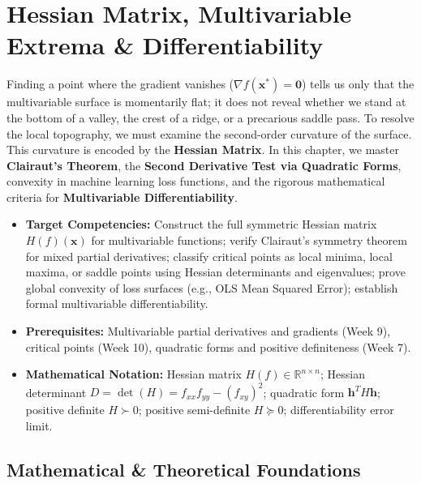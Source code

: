 \chapter{Hessian Matrix, Multivariable Extrema \& Differentiability}

Finding a point where the gradient vanishes ($\nabla f(\mathbf{x}^*) = \mathbf{0}$) tells us only that the multivariable surface is momentarily flat; it does not reveal whether we stand at the bottom of a valley, the crest of a ridge, or a precarious saddle pass. To resolve the local topography, we must examine the second-order curvature of the surface. This curvature is encoded by the \textbf{Hessian Matrix}. In this chapter, we master \textbf{Clairaut's Theorem}, the \textbf{Second Derivative Test via Quadratic Forms}, convexity in machine learning loss functions, and the rigorous mathematical criteria for \textbf{Multivariable Differentiability}.

\vspace{0.5cm}
\begin{tcolorbox}[colback=primarylight, colframe=primarydark, title={\textbf{Executive Roadmap \& Learning Objectives}}]
\begin{itemize}
    \item \textbf{Target Competencies:} Construct the full symmetric Hessian matrix $H(f)(\mathbf{x})$ for multivariable functions; verify Clairaut's symmetry theorem for mixed partial derivatives; classify critical points as local minima, local maxima, or saddle points using Hessian determinants and eigenvalues; prove global convexity of loss surfaces (e.g., OLS Mean Squared Error); establish formal multivariable differentiability.
    \item \textbf{Prerequisites:} Multivariable partial derivatives and gradients (Week 9), critical points (Week 10), quadratic forms and positive definiteness (Week 7).
    \item \textbf{Mathematical Notation:} Hessian matrix $H(f) \in \mathbb{R}^{n \times n}$; Hessian determinant $D = \det(H) = f_{xx} f_{yy} - (f_{xy})^2$; quadratic form $\mathbf{h}^T H \mathbf{h}$; positive definite $H \succ 0$; positive semi-definite $H \succeq 0$; differentiability error limit.
\end{itemize}
\end{tcolorbox}

\section{Mathematical \& Theoretical Foundations}

